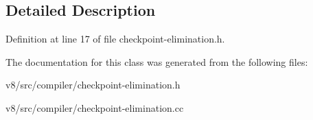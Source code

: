 \subsection{Detailed Description}


Definition at line 17 of file checkpoint-\/elimination.\+h.



The documentation for this class was generated from the following files\+:\begin{DoxyCompactItemize}
\item 
v8/src/compiler/checkpoint-\/elimination.\+h\item 
v8/src/compiler/checkpoint-\/elimination.\+cc\end{DoxyCompactItemize}

